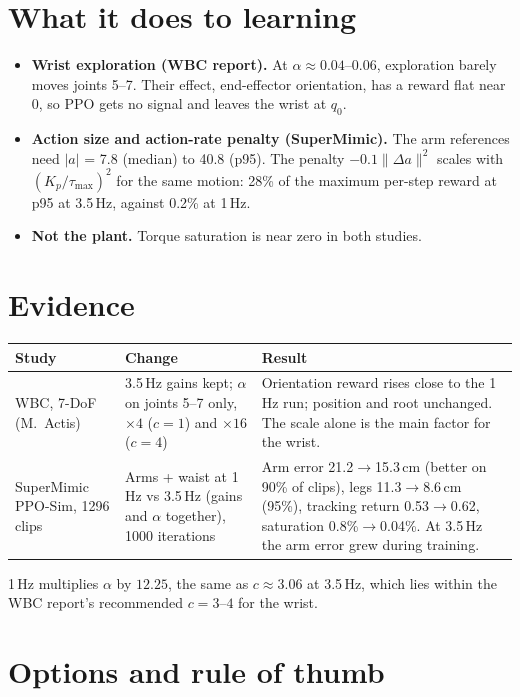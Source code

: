 \documentclass[10pt]{article}
\begin{document}
\section{What it does to learning}

\begin{itemize}
  \setlength{\itemsep}{1pt}
  \item \textbf{Wrist exploration (WBC report).} At $\alpha \approx 0.04$--$0.06$, exploration barely moves
  joints 5--7. Their effect, end-effector orientation, has a reward flat near 0, so PPO gets no signal and
  leaves the wrist at $q_0$.
  \item \textbf{Action size and action-rate penalty (SuperMimic).} The arm references need $|a|$ = 7.8
  (median) to 40.8 (p95). The penalty $-0.1\lVert\Delta a\rVert^2$ scales with $(K_p/\tau_{\max})^2$ for the
  same motion: 28\% of the maximum per-step reward at p95 at 3.5\,Hz, against 0.2\% at 1\,Hz.
  \item \textbf{Not the plant.} Torque saturation is near zero in both studies.
\end{itemize}

\section{Evidence}

\begin{center}
\small
\begin{tabular}{p{3.4cm}p{4.6cm}p{8.6cm}}
\toprule
Study & Change & Result \\
\midrule
WBC, 7-DoF (M.~Actis) & 3.5\,Hz gains kept; $\alpha$ on joints 5--7 only, $\times4$ ($c{=}1$) and
$\times16$ ($c{=}4$) &
Orientation reward rises close to the 1\,Hz run; position and root unchanged. The scale alone is the
main factor for the wrist. \\
SuperMimic PPO-Sim, 1296 clips & Arms + waist at 1\,Hz vs 3.5\,Hz (gains and $\alpha$ together),
1000 iterations &
Arm error 21.2$\to$15.3\,cm (better on 90\% of clips), legs 11.3$\to$8.6\,cm (95\%), tracking return
0.53$\to$0.62, saturation 0.8\%$\to$0.04\%. At 3.5\,Hz the arm error grew during training. \\
\bottomrule
\end{tabular}
\end{center}
1\,Hz multiplies $\alpha$ by $12.25$, the same as $c \approx 3.06$ at 3.5\,Hz, which lies within the WBC
report's recommended $c = 3$--$4$ for the wrist.

\section{Options and rule of thumb}
\end{document}
